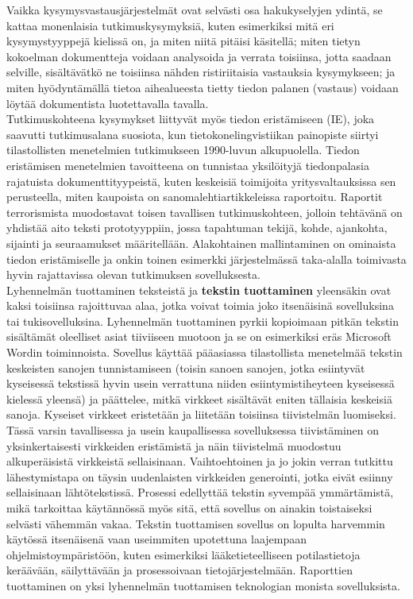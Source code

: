 \begin{multicols}{2}
Vaikka kysymysvastausjärjestelmät ovat selvästi osa hakukyselyjen
ydintä, se kattaa monenlaisia tutkimuskysymyksiä, 
kuten esimerkiksi mitä eri kysymystyyppejä kielissä on, ja miten niitä pitäisi
käsitellä; miten tietyn kokoelman dokumentteja voidaan analysoida ja
verrata toisiinsa, jotta saadaan selville, sisältävätkö ne toisiinsa
nähden ristiriitaisia vastauksia kysymykseen; ja miten hyödyntämällä tietoa 
aihealueesta tietty tiedon palanen (vastaus) voidaan löytää dokumentista luotettavalla tavalla.\\
Tutkimuskohteena kysymykset liittyvät myös tiedon eristämiseen (IE), joka saavutti
tutkimusalana suosiota, kun tietokonelingvistiikan painopiste siirtyi
tilastollisten menetelmien tutkimukseen 1990-luvun
alkupuolella. Tiedon eristämisen menetelmien tavoitteena on tunnistaa
yksilöityjä tiedonpalasia rajatuista dokumenttityypeistä, kuten
keskeisiä toimijoita yritysvaltauksissa sen perusteella, miten
kaupoista on sanomalehtiartikkeleissa raportoitu.  Raportit
terrorismista muodostavat toisen tavallisen tutkimuskohteen, jolloin tehtävänä on yhdistää
aito teksti prototyyppiin, jossa tapahtuman tekijä, kohde, ajankohta,
sijainti ja seuraamukset määritellään. Alakohtainen mallintaminen on
ominaista tiedon eristämiselle ja onkin toinen esimerkki järjestelmässä taka-alalla 
toimivasta hyvin rajattavissa olevan tutkimuksen sovelluksesta.\\
Lyhennelmän tuottaminen teksteistä ja \textbf{tekstin tuottaminen}
yleensäkin ovat kaksi toisiinsa rajoittuvaa alaa, jotka voivat toimia joko
itsenäisinä sovelluksina tai tukisovelluksina. Lyhennelmän tuottaminen pyrkii kopioimaan 
pitkän tekstin sisältämät oleelliset asiat tiiviiseen muotoon ja se on esimerkiksi
eräs Microsoft Wordin toiminnoista. Sovellus käyttää pääasiassa
tilastollista menetelmää tekstin keskeisten sanojen tunnistamiseen
(toisin sanoen sanojen, jotka esiintyvät kyseisessä tekstissä hyvin
usein verrattuna niiden esiintymistiheyteen kyseisessä kielessä
yleensä) ja päättelee, mitkä virkkeet sisältävät eniten tällaisia
keskeisiä sanoja. Kyseiset virkkeet eristetään ja liitetään toisiinsa
tiivistelmän luomiseksi. Tässä varsin tavallisessa ja usein
kaupallisessa sovelluksessa tiivistäminen on yksinkertaisesti
virkkeiden eristämistä ja näin tiivistelmä muodostuu alkuperäisistä
virkkeistä sellaisinaan. Vaihtoehtoinen ja jo jokin verran tutkittu lähestymistapa
on täysin uudenlaisten virkkeiden generointi, jotka eivät esiinny
sellaisinaan lähtötekstissä. Prosessi edellyttää tekstin syvempää
ymmärtämistä, mikä tarkoittaa käytännössä myös sitä, että sovellus on
ainakin toistaiseksi selvästi vähemmän vakaa. Tekstin tuottamisen sovellus on lopulta
harvemmin käytössä itsenäisenä vaan useimmiten upotettuna
laajempaan ohjelmistoympäristöön, kuten esimerkiksi lääketieteelliseen
potilastietoja keräävään, säilyttävään ja prosessoivaan
tietojärjestelmään. Raporttien tuottaminen on yksi lyhennelmän 
tuottamisen teknologian monista sovelluksista.


\end{multicols}
